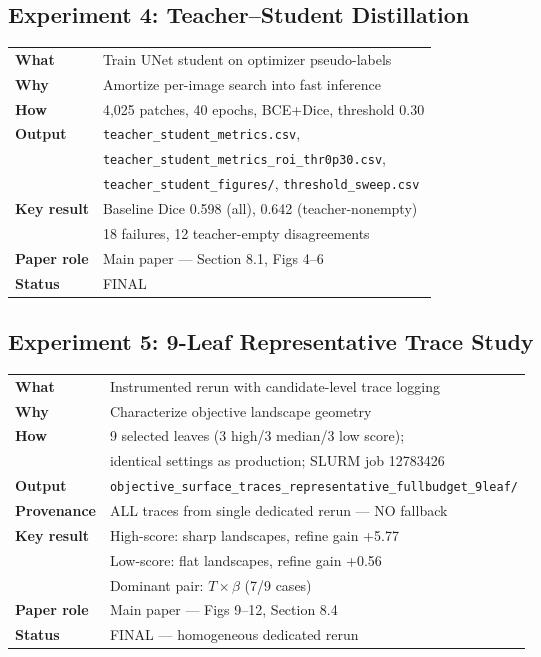 \documentclass[11pt,a4paper]{article}
\newcommand{\filepath}[1]{\texttt{\small #1}}
\begin{document}
\subsection{Experiment 4: Teacher--Student Distillation}

\begin{tabular}{ll}
\toprule
\textbf{What} & Train UNet student on optimizer pseudo-labels \\
\textbf{Why} & Amortize per-image search into fast inference \\
\textbf{How} & 4,025 patches, 40 epochs, BCE+Dice, threshold 0.30 \\
\textbf{Output} & \filepath{teacher\_student\_metrics.csv}, \\
 & \filepath{teacher\_student\_metrics\_roi\_thr0p30.csv}, \\
 & \filepath{teacher\_student\_figures/}, \filepath{threshold\_sweep.csv} \\
\textbf{Key result} & Baseline Dice 0.598 (all), 0.642 (teacher-nonempty) \\
 & 18 failures, 12 teacher-empty disagreements \\
\textbf{Paper role} & Main paper --- Section 8.1, Figs 4--6 \\
\textbf{Status} & FINAL \\
\bottomrule
\end{tabular}

\subsection{Experiment 5: 9-Leaf Representative Trace Study}

\begin{tabular}{ll}
\toprule
\textbf{What} & Instrumented rerun with candidate-level trace logging \\
\textbf{Why} & Characterize objective landscape geometry \\
\textbf{How} & 9 selected leaves (3 high/3 median/3 low score); \\
 & identical settings as production; SLURM job 12783426 \\
\textbf{Output} & \filepath{objective\_surface\_traces\_representative\_fullbudget\_9leaf/} \\
\textbf{Provenance} & ALL traces from single dedicated rerun --- NO fallback \\
\textbf{Key result} & High-score: sharp landscapes, refine gain +5.77 \\
 & Low-score: flat landscapes, refine gain +0.56 \\
 & Dominant pair: $T \times \beta$ (7/9 cases) \\
\textbf{Paper role} & Main paper --- Figs 9--12, Section 8.4 \\
\textbf{Status} & FINAL --- homogeneous dedicated rerun \\
\bottomrule
\end{tabular}
\end{document}

